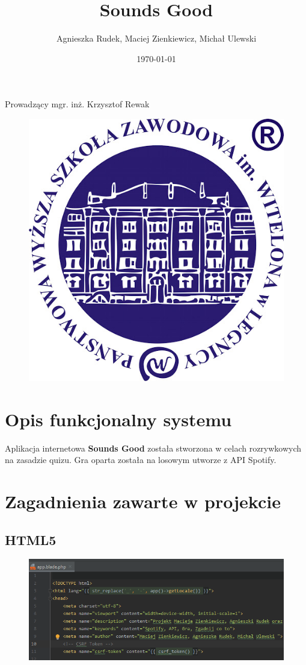 \documentclass[11pt,a4paper]{article}
\title{\Huge{Sounds Good}}
\author{Agnieszka Rudek, Maciej Zienkiewicz, Michał Ulewski}
\date{\today}
\begin{document}
\maketitle
\begin{center}
Prowadzący mgr. inż. Krzysztof Rewak
\end{center}
\begin{figure} [h]
\centering
\includegraphics [scale=0.8]{logo.jpg}
\end{figure}
\newpage
\tableofcontents
\newpage
\section{Opis funkcjonalny systemu}\label{sec:tekst}
Aplikacja internetowa \textbf{Sounds Good} została stworzona w celach rozrywkowych na zasadzie quizu. Gra oparta została na losowym utworze z API Spotify.
\section{Zagadnienia zawarte w projekcie}
\subsection{\textbf{HTML5}}
\begin{figure} [h]
\centering
\includegraphics [scale=0.8]{1.1.png}
\end{figure}
\end{document}
